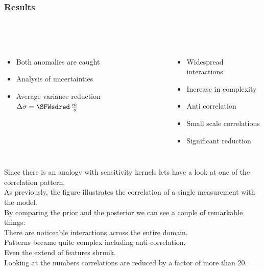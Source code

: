 \documentclass[aspectratio=169, t, 10pt,
    ]{beamer}
\begin{document}
\begin{frame}
    \frametitle{Results}
    \framesubtitle{~}

\begin{columns}
%

    \begin{itemize}
        \item Both anomalies are caught
        \item Analysis of uncertainties
        \item Average variance reduction $\Delta\sigma = \SFWsdred \, \frac ms$
    \end{itemize}
    \smallskip

    \begin{itemize}
        \item Widespread interactions
        \item Increase in complexity
        \item Anti correlation
        \item Small scale correlations
        \item Significant reduction
    \end{itemize}


    \vspace{-10mm}
    \centering \scriptsize
\end{columns}

\end{frame}

Since there is an analogy with sensitivity kernels lets have a look at one of the correlation pattern.
\\
As previously, the figure illustrates the correlation of a single measurement with the model.
\\
By comparing the prior and the posterior we can see a couple of remarkable things:
\\
There are noticeable interactions across the entire domain.
\\
Patterns became quite complex including anti-correlation.
\\
Even the extend of features shrunk.
\\
Looking at the numbers correlations are reduced by a factor of more than 20.
\end{document}
